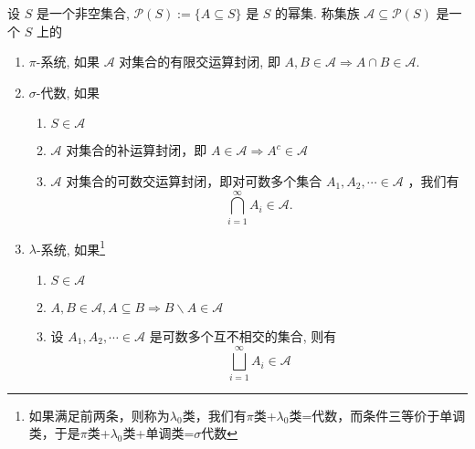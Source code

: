 \begin{definition}
    设 $S$ 是一个非空集合, $\mathcal{P}(S):=\{A \subseteq S\}$ 是 $S$ 的幂集. 称集族 $\mathcal{A} \subseteq \mathcal{P}(S)$ 是一个 $S$ 上的
    \begin{enumerate}
        \item $\pi$-系统, 如果 $\mathcal{A}$ 对集合的有限交运算封闭, 即 $A, B \in \mathcal{A} \Longrightarrow A \cap B \in \mathcal{A}$.
        \item $\sigma$-代数, 如果
              \begin{enumerate}[label=(\roman*)]
                  \item $S \in \mathcal{A}$
                  \item $\mathcal{A}$ 对集合的补运算封闭，即 $A \in \mathcal{A} \Longrightarrow A^c \in \mathcal{A}$
                  \item $\mathcal{A}$ 对集合的可数交运算封闭，即对可数多个集合 $A_1, A_2, \cdots \in \mathcal{A}$ ，我们有
                        $$
                            \bigcap_{i=1}^{\infty} A_i \in \mathcal{A} .
                        $$
              \end{enumerate}
        \item $\lambda$-系统, 如果\footnote{如果满足前两条，则称为$\lambda_0$类，我们有$\pi$类+$\lambda_0$类=代数，而条件三等价于单调类，于是$\pi$类+$\lambda_0$类+单调类=$\sigma$代数}
              \begin{enumerate}[label=(\roman*)]
                  \item \label{def:lambda_system_1}$S \in \mathcal{A}$
                  \item \label{def:lambda_system_2}$A, B \in \mathcal{A}, A \subseteq B \Longrightarrow B \backslash A \in \mathcal{A}$
                  \item {}设 $A_1, A_2, \cdots \in \mathcal{A}$ 是可数多个互不相交的集合, 则有
                        $$
                            \bigsqcup_{i=1}^{\infty} A_i \in \mathcal{A}
                        $$
              \end{enumerate}
    \end{enumerate}
\end{definition}

